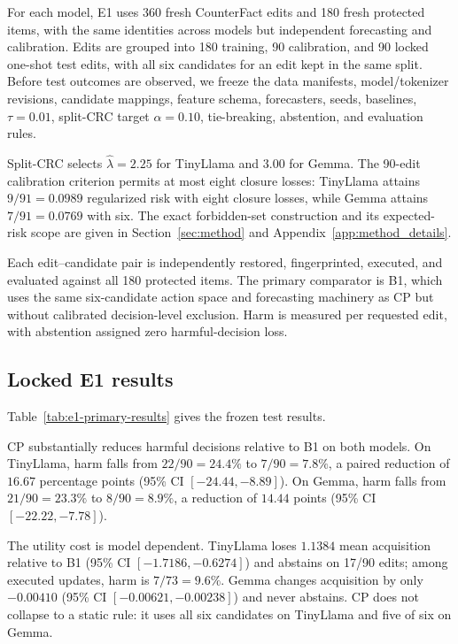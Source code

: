 \documentclass{article} %
\begin{document}
For each model, E1 uses 360 fresh CounterFact edits and 180 fresh protected
items, with the same identities across models but independent forecasting and
calibration. Edits are grouped into 180 training, 90 calibration, and 90
locked one-shot test edits, with all six candidates for an edit kept in the
same split. Before test outcomes are observed, we freeze the data manifests,
model/tokenizer revisions, candidate mappings, feature schema, forecasters,
seeds, baselines, $\tau=0.01$, split-CRC target $\alpha=0.10$, tie-breaking,
abstention, and evaluation rules.

Split-CRC selects $\widehat\lambda=2.25$ for TinyLlama and $3.00$ for Gemma.
The 90-edit calibration criterion permits at most eight closure losses:
TinyLlama attains $9/91=0.0989$ regularized risk with eight closure losses,
while Gemma attains $7/91=0.0769$ with six. The exact forbidden-set
construction and its expected-risk scope are given in
Section~\ref{sec:method} and Appendix~\ref{app:method_details}.

Each edit--candidate pair is independently restored, fingerprinted, executed,
and evaluated against all 180 protected items. The primary comparator is B1,
which uses the same six-candidate action space and forecasting machinery as CP
but without calibrated decision-level exclusion. Harm is measured per
requested edit, with abstention assigned zero harmful-decision loss.

\subsection{Locked E1 results}
\label{sec:e1_main_results}

Table~\ref{tab:e1-primary-results} gives the frozen test results.



CP substantially reduces harmful decisions relative to B1 on both models. On
TinyLlama, harm falls from $22/90=24.4\%$ to $7/90=7.8\%$, a paired reduction
of $16.67$ percentage points (95\% CI $[-24.44,-8.89]$). On Gemma, harm falls
from $21/90=23.3\%$ to $8/90=8.9\%$, a reduction of $14.44$ points (95\% CI
$[-22.22,-7.78]$).

The utility cost is model dependent. TinyLlama loses $1.1384$ mean acquisition
relative to B1 (95\% CI $[-1.7186,-0.6274]$) and abstains on 17/90 edits;
among executed updates, harm is $7/73=9.6\%$. Gemma changes acquisition by
only $-0.00410$ (95\% CI $[-0.00621,-0.00238]$) and never abstains. CP does
not collapse to a static rule: it uses all six candidates on TinyLlama and five
of six on Gemma.
\end{document}
